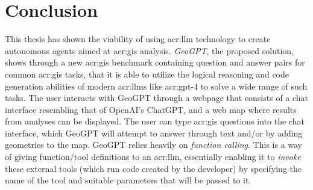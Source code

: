\chapter{Conclusion}
\label{cha:conclusion}



\begin{comment}
What are the main contributions made to the field?
How significant are these contributions?
Also discuss the contributions in terms of the goals and research questions formulated in the Introduction.

The contributions section will normally contain everything that you address in the abstract, but in an extended form and quite possibly additional issues that cannot be included in the abstract.
An obvious difference is that when the reader has come this far in the text, she/he should be quite familiar with the work, but while reading the abstract they will have little to no knowledge of the work.

The section ``Contributions'' in Chapter~\ref{cha:introduction} differs from this one in that the former is just a list of the main bits, while this section should explain them in more detail.
However, basically the same items should appear in both sections.
\end{comment}

This thesis has shown the viability of using \gls{acr:llm} technology to create autonomous agents aimed at \acrshort{acr:gis} analysis. \textit{GeoGPT}, the proposed solution, shows through a new \acrshort{acr:gis} benchmark containing question and answer pairs for common \acrshort{acr:gis} tasks, that it is able to utilize the logical reasoning and code generation abilities of modern \glspl{acr:llm} like \acrshort{acr:gpt}-4 to solve a wide range of such tasks. The user interacts with GeoGPT through a webpage that consists of a chat interface resembling that of OpenAI's ChatGPT, and a web map where results from analyses can be displayed. The user can type \acrshort{acr:gis} questions into the chat interface, which GeoGPT will attempt to answer through text and/or by adding geometries to the map. GeoGPT relies heavily on \textit{function calling}. This is a way of giving function/tool definitions to an \acrshort{acr:llm}, essentially enabling it to \textit{invoke} these external tools (which run code created by the developer) by specifying the name of the tool and suitable parameters that will be passed to it.

